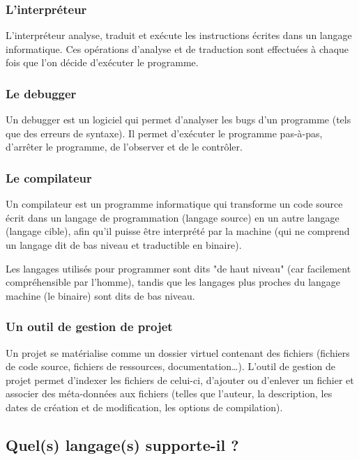 \documentclass[a4paper,12pt]{article}
\begin{document}
\subsubsection{L'interpréteur}

L'interpréteur analyse,  traduit et  exécute les  instructions écrites
dans  un   langage  informatique.  Ces  opérations   d'analyse  et  de
traduction sont effectuées à chaque fois que l'on décide d'exécuter le
programme.

\subsubsection{Le debugger}

Un  debugger est  un  logiciel  qui permet  d'analyser  les bugs  d'un
programme (tels que  des erreurs de syntaxe). Il  permet d'exécuter le
programme pas-à-pas,  d'arrêter le programme,  de l'observer et  de le
contrôler.

\subsubsection{Le compilateur}

Un compilateur est un programme informatique qui transforme un code source écrit dans un langage de programmation (langage source) en un autre langage (langage cible), afin qu'il puisse être interprété par la machine (qui ne comprend un langage dit de bas niveau et traductible en binaire).

Les langages utilisés pour programmer sont dits "de haut niveau" (car facilement compréhensible par l'homme), tandis que les langages plus proches du langage machine (le binaire) sont dits de bas niveau. 

\subsubsection{Un outil de gestion de projet}

Un  projet  se matérialise  comme  un  dossier virtuel  contenant  des
fichiers   (fichiers  de   code   source,   fichiers  de   ressources,
documentation\dots).  L'outil  de gestion  de projet  permet d'indexer
les  fichiers  de  celui-ci,  d'ajouter ou  d'enlever  un  fichier  et
associer  des  méta-données  aux  fichiers (telles  que  l'auteur,  la
description, les dates de création  et de modification, les options de
compilation).

\subsection{Quel(s) langage(s) supporte-il ?}
\end{document}
